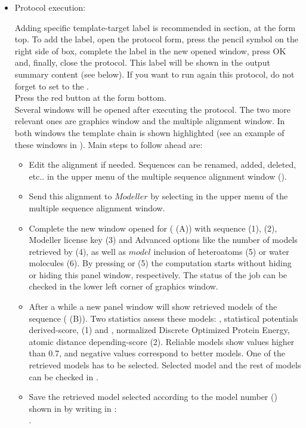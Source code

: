 \begin{itemize}
\begin{itemize}
  \end{itemize}
  \item Protocol execution:
  
  Adding specific template-target label is recommended in  section, at the form top. To add the label, open the protocol form, press the pencil symbol on the right side of  box, complete the label in the new opened window, press OK and, finally, close the protocol. This label will be shown in the output summary content (see below). If you want to run again this protocol, do not forget to set to  the .\\
  Press the  red button at the form bottom.\\
  
  Several \chimera windows will be opened after executing the protocol. The two more relevant ones are \chimera graphics window and the multiple alignment window. In both windows the template chain is shown highlighted (see an example of these windows in ). Main steps to follow ahead are:
  \begin{itemize}
   \item Edit the alignment if needed. Sequences can be renamed, added, deleted, etc.. in the upper menu of the multiple sequence alignment window ().
   \item Send this alignment to $Modeller$ by selecting  in the upper menu of the multiple sequence alignment window. 
   \item Complete the new window opened for  ( (A)) with  sequence (1),  (2), Modeller license key (3) and Advanced options like the number of models retrieved by \modeller (4), as well as $model$ inclusion of heteroatoms (5) or water molecules (6). By pressing  or  (5) the computation starts without hiding or hiding this panel window, respectively. The status of the job can be checked in the lower left corner of \chimera graphics window.
   \item After a while a new panel window will show retrieved models of the  sequence ( (B)). Two statistics assess these models: , statistical potentials derived-score, (1) and , normalized Discrete Optimized Protein Energy, atomic distance depending-score (2). Reliable models show  values higher than 0.7, and negative  values correspond to better models. One of the retrieved models has to be selected. Selected model and the rest of models can be checked in \chimera {}.
   \item Save the retrieved model selected according to the model number () shown in \chimera {} by writing in \chimera {}:\\.
  \end{itemize}
  

\end{itemize}

